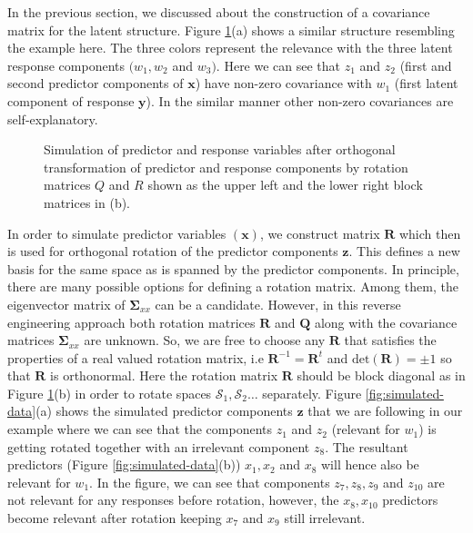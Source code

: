 \documentclass[review]{elsarticle}
\theoremstyle{definition}
\theoremstyle{definition}
\theoremstyle{definition}
\theoremstyle{remark}
\begin{document}
In the previous section, we discussed about the construction of a
covariance matrix for the latent structure. Figure
\ref{fig:cov-plot-print}(a) shows a similar structure resembling the
example here. The three colors represent the relevance with the three
latent response components \((w_1, w_2\) and \(w_3)\). Here we can see
that \(z_{1}\) and \(z_{2}\) (first and second predictor components of
\(\mathbf{x}\)) have non-zero covariance with \(w_1\) (first latent
component of response \(\mathbf{y}\)). In the similar manner other
non-zero covariances are self-explanatory.

\begin{figure}[!htb]
\caption{Simulation of predictor and response variables after orthogonal transformation of predictor and response components by rotation matrices $Q$ and $R$ shown as the upper left and the lower right block matrices in (b).}\label{fig:cov-plot-print}
\end{figure}

In order to simulate predictor variables \((\mathbf{x})\), we construct
matrix \(\mathbf{R}\) which then is used for orthogonal rotation of the
predictor components \(\mathbf{z}\). This defines a new basis for the
same space as is spanned by the predictor components. In principle,
there are many possible options for defining a rotation matrix. Among
them, the eigenvector matrix of \(\boldsymbol{\Sigma}_{xx}\) can be a
candidate. However, in this reverse engineering approach both rotation
matrices \(\mathbf{R}\) and \(\mathbf{Q}\) along with the covariance
matrices \(\boldsymbol{\Sigma}_{xx}\) are unknown. So, we are free to
choose any \(\mathbf{R}\) that satisfies the properties of a real valued
rotation matrix, i.e \(\mathbf{R}^{-1} = \mathbf{R}^t\) and
\(\text{det}(\mathbf{R}) = \pm 1\) so that \(\mathbf{R}\) is
orthonormal. Here the rotation matrix \(\mathbf{R}\) should be block
diagonal as in Figure \ref{fig:cov-plot-print}(b) in order to rotate
spaces \(\mathcal{S}_1, \mathcal{S}_2 \ldots\) separately. Figure
\ref{fig:simulated-data}(a) shows the simulated predictor components
\(\mathbf{z}\) that we are following in our example where we can see
that the components \(z_{1}\) and \(z_{2}\) (relevant for \(w_1\)) is
getting rotated together with an irrelevant component \(z_{8}\). The
resultant predictors (Figure \ref{fig:simulated-data}(b))
\(x_{1}, x_{2}\) and \(x_{8}\) will hence also be relevant for \(w_1\).
In the figure, we can see that components \(z_{7}, z_{8}, z_{9}\) and
\(z_{10}\) are not relevant for any responses before rotation, however,
the \(x_{8}, x_{10}\) predictors become relevant after rotation keeping
\(x_{7}\) and \(x_{9}\) still irrelevant.
\end{document}
